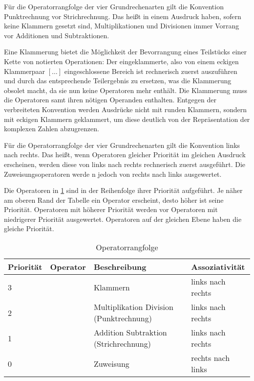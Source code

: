 \documentclass{sdqassignment}
\begin{document}
Für die Operatorrangfolge der vier Grundrechenarten gilt die Konvention Punktrechnung vor Strichrechnung. Das heißt in einem Ausdruck haben, sofern keine Klammern gesetzt sind, Multiplikationen und Divisionen immer Vorrang vor Additionen und Subtraktionen.

Eine Klammerung bietet die Möglichkeit der Bevorrangung eines Teilstücks einer Kette von notierten Operationen: Der eingeklammerte, also von einem eckigen Klammerpaar \([\ldots]\) eingeschlossene Bereich ist rechnerisch zuerst auszuführen und durch das entsprechende Teilergebnis zu ersetzen, was die Klammerung obsolet macht, da sie nun keine Operatoren mehr enthält. Die Klammerung muss die Operatoren samt ihren nötigen Operanden enthalten. Entgegen der verbreiteten Konvention werden Ausdrücke nicht mit runden Klammern, sondern mit eckigen Klammern geklammert, um diese deutlich von der Repräsentation der komplexen Zahlen abzugrenzen.

Für die Operatorrangfolge der vier Grundrechenarten gilt die Konvention links nach rechts. Das heißt, wenn Operatoren gleicher Priorität im gleichen Ausdruck erscheinen, werden diese von links nach rechts rechnerisch zuerst ausgeführt.
Die Zuweisungsoperatoren werde n jedoch von rechts nach links ausgewertet.

Die Operatoren in \cref{tab:operator} sind in der Reihenfolge ihrer Priorität aufgeführt. Je näher am oberen Rand der Tabelle ein Operator erscheint, desto höher ist seine Priorität. Operatoren mit höherer Priorität werden vor Operatoren mit niedrigerer Priorität ausgewertet. Operatoren auf der gleichen Ebene haben die gleiche Priorität.

\begin{table}[]
    \centering
    \begin{tabular}{|l|l|l|l|}
    \hline
    Priorität & Operator & Beschreibung & Assoziativität \\ \hline
    3 & \lstinlinetxt{[} \lstinlinetxt{]} & Klammern & links nach rechts \\ \hline
    2 & \lstinlinetxt{*} \lstinlinetxt{/} & Multiplikation Division (Punktrechnung) & links nach rechts \\ \hline
    1 & \lstinlinetxt{+} \lstinlinetxt{-} & Addition Subtraktion (Strichrechnung) & links nach rechts \\ \hline
    0 & \lstinlinetxt{=} & Zuweisung & rechts nach links \\ \hline
    \end{tabular}
    \caption{Operatorrangfolge}
    \label{tab:operator}
\end{table}
\end{document}
